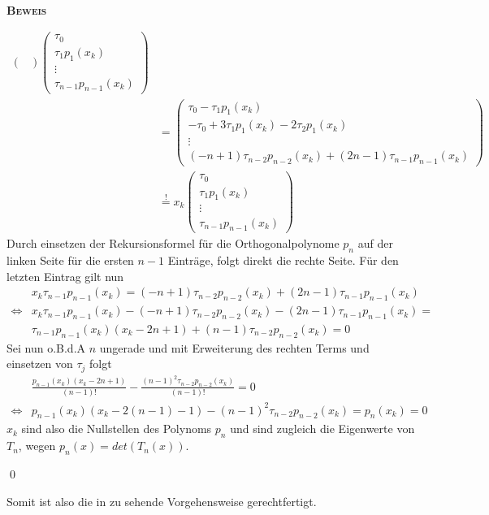 \documentclass[12pt,a4paper]{scrartcl}
\numberwithin{equation}{section}
\numberwithin{myalgctr}{section}
\numberwithin{mytheoremctr}{subsection}
\numberwithin{mykorollarctr}{subsection}
\numberwithin{mylemmactr}{subsection}
\numberwithin{mybeispielctr}{subsection}
\newenvironment{myproof}{%
	\bigskip\noindent%
	\textsc{\textbf{\\Beweis\\}}%
	\indent
}{\qed\par\bigskip}  %
\begin{document}
\begin{myproof}
\begin{itemize}
\begin{align*}
\begin{pmatrix}
				\end{pmatrix}
				\begin{pmatrix}
					\tau_0 \\ \tau_1p_1(x_k) \\ \vdots \\ \tau_{n-1}p_{n-1}(x_k)
				\end{pmatrix} \\
				& = 
				\begin{pmatrix}
				\tau_0 -\tau_1p_1(x_k)  \\ -\tau_0 + 3\tau_1p_1(x_k) - 2\tau_2p_1(x_k)\\ \vdots \\ (-n+1)\tau_{n-2}p_{n-2}(x_k) + (2n-1)\tau_{n-1}p_{n-1}(x_k) 
				\end{pmatrix} \\
				& \stackrel{!}{=}
				x_k	
				\begin{pmatrix}
				\tau_0 \\ \tau_1p_1(x_k) \\ \vdots \\ \tau_{n-1}p_{n-1}(x_k)
				\end{pmatrix}
			\end{align*}
			Durch einsetzen der Rekursionsformel für die Orthogonalpolynome $p_n$ auf der linken Seite für die ersten $n-1$ Einträge, folgt direkt die rechte Seite. Für den letzten Eintrag gilt nun
			\begin{align*}
				&x_k\tau_{n-1}p_{n-1}(x_k) = (-n+1)\tau_{n-2}p_{n-2}(x_k) + (2n-1)\tau_{n-1}p_{n-1}(x_k) \\
				\Leftrightarrow &  x_k\tau_{n-1}p_{n-1}(x_k) - (-n+1)\tau_{n-2}p_{n-2}(x_k) - (2n-1)\tau_{n-1}p_{n-1}(x_k) = \\
				& \tau_{n-1}p_{n-1}(x_k)(x_k-2n+1) + (n-1)\tau_{n-2}p_{n-2}(x_k) = 0
			\end{align*} 
			Sei nun o.B.d.A $n$ ungerade und mit Erweiterung des rechten Terms und einsetzen von $\tau_j$ folgt
			\begin{align*}
				&\frac{p_{n-1}(x_k)(x_k-2n+1)}{(n-1)!} - \frac{(n-1)^2\tau_{n-2}p_{n-2}(x_k)}{(n-1)!} = 0 \\
				\Leftrightarrow & p_{n-1}(x_k)(x_k-2(n-1)-1) - (n-1)^2\tau_{n-2}p_{n-2}(x_k) = p_n(x_k) = 0
			\end{align*}
			$x_k$ sind also die Nullstellen des Polynoms $p_n$ und sind zugleich die Eigenwerte von $T_n$, wegen $p_n(x) = det(T_n(x))$. \autocite[vgl. 40][]{übung}
		\end{itemize}
	\end{myproof}
	\newpage
	Somit ist also die in  zu sehende Vorgehensweise gerechtfertigt.
	
	
	
\end{document}
